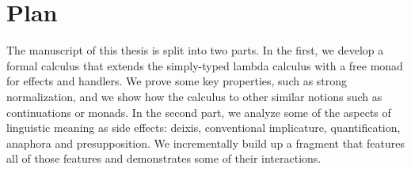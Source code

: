 \section*{Plan}

The manuscript of this thesis is split into two parts. In the first, we
develop a formal calculus that extends the simply-typed lambda calculus
with a free monad for effects and handlers. We prove some key properties,
such as strong normalization, and we show how the calculus to other similar
notions such as continuations or monads. In the second part, we analyze
some of the aspects of linguistic meaning as side effects: deixis,
conventional implicature, quantification, anaphora and presupposition. We
incrementally build up a fragment that features all of those features and
demonstrates some of their interactions.

